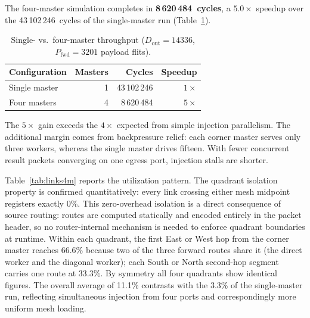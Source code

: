 The four-master simulation completes in \textbf{8\,620\,484~cycles}, a
$\mathbf{5.0\times}$ speedup over the 43\,102\,246~cycles of the
single-master run (Table~\ref{tab:throughput}).

\begin{table}[h]
\centering
\footnotesize
\setlength{\tabcolsep}{4pt}
\caption{Single- vs.\ four-master throughput
         ($D_\text{out}=14336$, $P_\text{fwd}=3201$ payload flits).}
\label{tab:throughput}
\begin{tabular}{@{}lrrr@{}}
\toprule
Configuration & Masters & Cycles & Speedup \\
\midrule
Single master & 1 & 43\,102\,246 & $1\times$ \\
Four masters  & 4 &  8\,620\,484 & $5\times$ \\
\bottomrule
\end{tabular}
\end{table}

The $5\times$ gain exceeds the $4\times$ expected from simple injection
parallelism.  The additional margin comes from backpressure relief: each
corner master serves only three workers, whereas the single master drives
fifteen.  With fewer concurrent result packets converging on one egress
port, injection stalls are shorter.

Table~\ref{tab:links4m} reports the utilization pattern.  The quadrant
isolation property is confirmed quantitatively: every link crossing either
mesh midpoint registers exactly 0\%.  This zero-overhead isolation is a
direct consequence of source routing: routes are computed statically and
encoded entirely in the packet header, so no router-internal mechanism is
needed to enforce quadrant boundaries at runtime.  Within each quadrant, the first East
or West hop from the corner master reaches 66.6\% because two of the three
forward routes share it (the direct worker and the diagonal worker); each
South or North second-hop segment carries one route at 33.3\%.  By symmetry
all four quadrants show identical figures.  The overall average of 11.1\%
contrasts with the 3.3\% of the single-master run, reflecting simultaneous
injection from four ports and correspondingly more uniform mesh loading.

